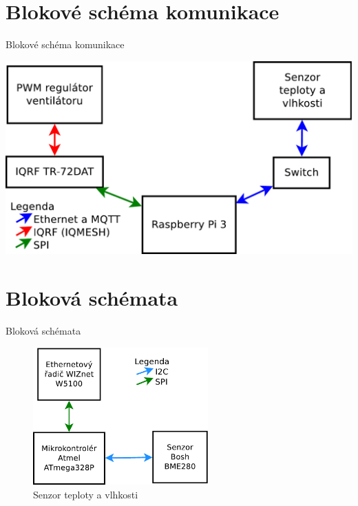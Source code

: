 \documentclass[11pt]{beamer}
\begin{document}
\section{Blokové schéma komunikace}

\begin{frame}{Blokové schéma komunikace}
  \begin{center}
    \includegraphics[width = \textwidth]{../img/blokove-schema/komunikace.pdf}
  \end{center}
\end{frame}


\section{Bloková schémata}

\begin{frame}{Bloková schémata}
  \begin{center}
    \begin{figure}
      \includegraphics[width = 0.60\textwidth]{../img/blokove-schema/senzor.pdf}
      \caption{Senzor teploty a vlhkosti}
    \end{figure}
  \end{center}
\end{frame}
\end{document}
